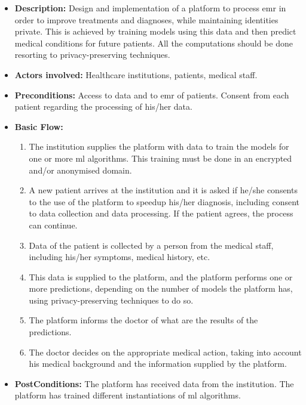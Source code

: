 \begin{itemize}
	

	\item \textbf{Description:} Design and implementation of a platform to process \ac{emr} in order to improve treatments and diagnoses, while maintaining identities private. This is achieved by training models using this data and then predict medical conditions for future patients. All the computations should be done resorting to privacy-preserving techniques.

	\item \textbf{Actors involved:} Healthcare institutions, patients, medical staff.

	\item \textbf{Preconditions:} Access to data and to \ac{emr} of patients. Consent from each patient regarding the processing of his/her data.

	\item \textbf{Basic Flow:} 
	
	\begin{enumerate}
		\item The institution supplies the platform with data to train the models for one or more \ac{ml} algorithms. This training must be done in an encrypted and/or anonymised domain.

		\item A new patient arrives at the institution and it is asked if he/she consents to the use of the platform to speedup his/her diagnosis, including consent to data collection and data processing. If the patient agrees, the process can continue.

		\item Data of the patient is collected by a person from the medical staff, including his/her symptoms, medical history, etc.

		\item This data is supplied to the platform, and the platform performs one or more predictions, depending on the number of models the platform has, using privacy-preserving techniques to do so.

		\item The platform informs the doctor of what are the results of the predictions.

		\item The doctor decides on the appropriate medical action, taking into account his medical background and the information supplied by the platform.


	\end{enumerate}

	\item \textbf{PostConditions:} The platform has received data from the institution. The platform has trained different instantiations of \ac{ml} algorithms.

\end{itemize}





